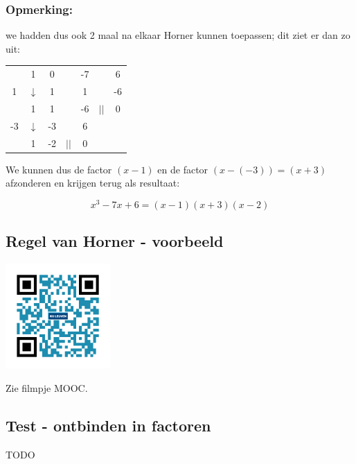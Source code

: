 \begin{voorbeeld}
\subsubsection{Opmerking:} we hadden dus ook 2 maal na elkaar Horner kunnen toepassen; dit ziet er dan zo uit:


\begin{center}
	\begin{tabular}{c|cccccc}
		& 1 & 0 & &-7 & & 6 \\
		1 & $\downarrow$ & 1 & & 1 & & -6\\
		\hline 
		& 1 & 1 & & -6 & $||$ & 0 \\
		-3 & $\downarrow$ & -3 & & 6 & &\\
		\hline
		& 1 & -2 & $||$ & 0 &
	\end{tabular}
\end{center}


We kunnen dus de factor $(x-1)$ en de factor $(x-(-3))=(x+3)$ afzonderen en krijgen terug als resultaat:

\begin{equation*}
x^3-7x+6=(x-1)(x+3)(x-2)
\end{equation*}
\end{voorbeeld}

\subsection{Regel van Horner - voorbeeld}
\begin{minipage}{.25\linewidth}
	\raggedright
	\includegraphics[width=4cm]{1_elem_rekenvaardigheden_A/inputs/QR_Code_HORNER_module1}
\end{minipage}
\begin{minipage}{.7\linewidth}
	Zie filmpje MOOC.
\end{minipage}

\subsection{Test - ontbinden in factoren}
TODO